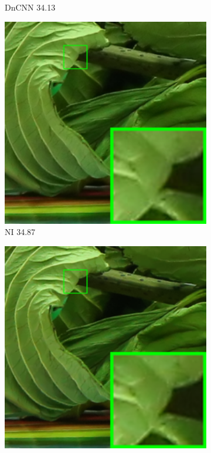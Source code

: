 \begin{figure}
\begin{subfigure}[t]{0.19\textwidth}
\caption{DnCNN 34.13}
    \end{subfigure}
\hfill
    \begin{subfigure}[t]{0.19\textwidth}
        \centering
        \includegraphics[width=1\textwidth]{images/guided/cc15/resize_br_NI_5dmark3_iso3200_2_real.png}
		\caption{NI 34.87}
    \end{subfigure}
    \hfill
    \begin{subfigure}[t]{0.19\textwidth}
        \centering
        \includegraphics[width=1\textwidth]{images/guided/cc15/resize_br_NC_5dmark3_iso3200_2_real.png}

\end{subfigure}
\end{figure}
